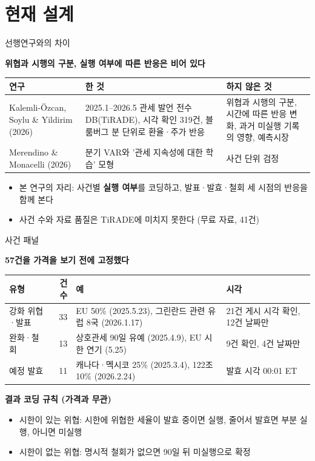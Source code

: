 \documentclass[aspectratio=169,9pt,t]{beamer}
\newcommand{\msg}[1]{{\fontsize{11.5}{15}\selectfont\bfseries\color{navy}\RaggedRight #1\par}\vspace{2.0mm}}
\newcommand{\lab}[1]{{\fontsize{8.4}{10.5}\selectfont\bfseries\color{crim}#1}}
\renewcommand{\arraystretch}{1.3}
\newcommand{\tf}{\fontsize{8.2}{10.4}\selectfont}
\newcommand{\tfs}{\fontsize{7.5}{9.4}\selectfont\renewcommand{\arraystretch}{1.18}}
\begin{document}
\section{현재 설계}

\begin{frame}{선행연구와의 차이}
\msg{위협과 시행의 구분, 실행 여부에 따른 반응은 비어 있다}
\begingroup\tf
\begin{tabularx}{\textwidth}{@{}L{0.27\textwidth}L{0.36\textwidth}Y@{}}
\toprule
연구 & 한 것 & 하지 않은 것\\
\midrule
Kalemli-Özcan, Soylu \& Yildirim (2026) & 2025.1--2026.5 관세 발언 전수 DB(TiRADE), 시각 확인 319건, 블룸버그 분 단위로 환율·주가 반응 & 위협과 시행의 구분, 시간에 따른 반응 변화, 과거 미실행 기록의 영향, 예측시장\\
Merendino \& Monacelli (2026) & 분기 VAR와 '관세 지속성에 대한 학습' 모형 & 사건 단위 검정\\
\bottomrule
\end{tabularx}\endgroup
\vspace{2mm}
\begin{itemize}
\item 본 연구의 자리: 사건별 \textbf{실행 여부}를 코딩하고, 발표·발효·철회 세 시점의 반응을 함께 본다
\item 사건 수와 자료 품질은 TiRADE에 미치지 못한다 (무료 자료, 41건)
\end{itemize}
\end{frame}

\begin{frame}{사건 패널}
\msg{57건을 가격을 보기 전에 고정했다}
\begingroup\tfs
\begin{tabularx}{\textwidth}{@{}L{0.2\textwidth}rL{0.3\textwidth}Y@{}}
\toprule
유형 & 건수 & 예 & 시각\\
\midrule
강화 위협·발표 & 33 & EU 50\% (2025.5.23), 그린란드 관련 유럽 8국 (2026.1.17) & 21건 게시 시각 확인, 12건 날짜만\\
완화·철회 & 13 & 상호관세 90일 유예 (2025.4.9), EU 시한 연기 (5.25) & 9건 확인, 4건 날짜만\\
예정 발효 & 11 & 캐나다·멕시코 25\% (2025.3.4), 122조 10\% (2026.2.24) & 발효 시각 00:01 ET\\
\bottomrule
\end{tabularx}\endgroup
\vspace{2mm}
\lab{결과 코딩 규칙 (가격과 무관)}
\begin{itemize}
\item 시한이 있는 위협: 시한에 위협한 세율이 발효 중이면 실행, 줄어서 발효면 부분 실행, 아니면 미실행
\item 시한이 없는 위협: 명시적 철회가 없으면 90일 뒤 미실행으로 확정
\end{itemize}
\end{frame}
\end{document}
